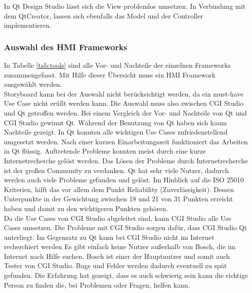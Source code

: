 In Qt Design Studio lässt sich die View problemlos umsetzen. In Verbindung mit dem QtCreator, lassen sich ebenfalls das Model und der Controller implementieren.\\

\subsubsection{Auswahl des HMI Frameworks}

In Tabelle \ref{tab:tools} sind alle Vor- und Nachteile der einzelnen Frameworks zusammengefasst. Mit Hilfe dieser Übersicht muss ein \ac{HMI} Framework ausgewählt werden.\\

Storyboard kann bei der Auswahl nicht berücksichtigt werden, da ein must-have Use Case nicht erüllt werden kann. Die Auswahl muss also zwischen CGI Studio und Qt getroffen werden. Bei einem Vergleich der Vor- und Nachteile von Qt und CGI Studio gewinnt Qt. Während der Benutzung von Qt haben sich kaum Nachteile gezeigt. In Qt konnten alle wichtigen Use Cases zufriedenstellend umgesetzt werden. Nach einer kurzen Einarbeitungszeit funktioniert das Arbeiten in Qt flüssig. Auftretende Probleme konnten meist durch eine kurze Internetrecherche gelöst werden. Das Lösen der Probleme durch Internetrecherche ist der großen Community zu verdanken. Qt hat sehr viele Nutzer, dadurch werden auch viele Probleme gefunden und gelöst. Im Hinblick auf die ISO 25010 Kriterien, hilft das vor allem dem Punkt Reliability (Zuverlässigkeit). Dessen Unterpunkte in der Gewichtung zwischen 18 und 21 von 31 Punkten erreicht haben und damit zu den wichtigeren Punkten gehören.\\


Da die Use Cases von CGI Studio abgeleitet sind, kann CGI Studio alle Use Cases umsetzen. Die Probleme mit CGI Studio sorgen dafür, dass CGI Studio Qt unterliegt. Im Gegensatz zu Qt kann bei CGI Studio nicht im Internet recherchiert werden Es gibt einfach keine Nutzer außerhalb von Bosch, die im Internet nach Hilfe suchen. Bosch ist einer der Hauptnutzer und somit auch Tester von CGI Studio. Bugs und Fehler werden dadurch eventuell zu spät gefunden. Die Erfahrung hat gezeigt, dass es auch schwierig sein kann die richtige Person zu finden die, bei Problemen oder Fragen, helfen kann.\\



